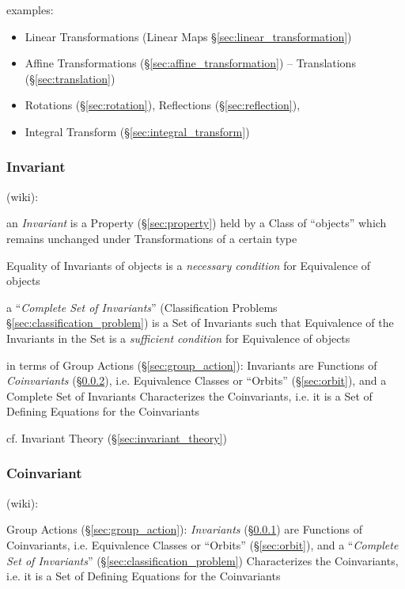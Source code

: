 examples:

\begin{itemize}
  \item Linear Transformations (Linear Maps \S\ref{sec:linear_transformation})
  \item Affine Transformations (\S\ref{sec:affine_transformation}) --
    Translations (\S\ref{sec:translation})
  \item Rotations (\S\ref{sec:rotation}), Reflections (\S\ref{sec:reflection}),
  \item Integral Transform (\S\ref{sec:integral_transform})
\end{itemize}



\subsubsection{Invariant}\label{sec:invariant}

(wiki):

an \emph{Invariant} is a Property (\S\ref{sec:property}) held by a Class
of ``objects'' which remains unchanged under Transformations of a certain type

Equality of Invariants of objects is a \emph{necessary condition} for
Equivalence of objects

a ``\emph{Complete Set of Invariants}'' (Classification Problems
\S\ref{sec:classification_problem}) is a Set of Invariants such that Equivalence
of the Invariants in the Set is a \emph{sufficient condition} for Equivalence of
objects

in terms of Group Actions (\S\ref{sec:group_action}): Invariants are Functions
of \emph{Coinvariants} (\S\ref{sec:coinvariant}), i.e. Equivalence Classes or
``Orbits'' (\S\ref{sec:orbit}), and a Complete Set of Invariants Characterizes
the Coinvariants, i.e. it is a Set of Defining Equations for the Coinvariants

cf. Invariant Theory (\S\ref{sec:invariant_theory})



\subsubsection{Coinvariant}\label{sec:coinvariant}

(wiki):

Group Actions (\S\ref{sec:group_action}): \emph{Invariants}
(\S\ref{sec:invariant}) are Functions of Coinvariants, i.e. Equivalence Classes
or ``Orbits'' (\S\ref{sec:orbit}), and a ``\emph{Complete Set of Invariants}''
(\S\ref{sec:classification_problem}) Characterizes the Coinvariants, i.e. it is
a Set of Defining Equations for the Coinvariants



